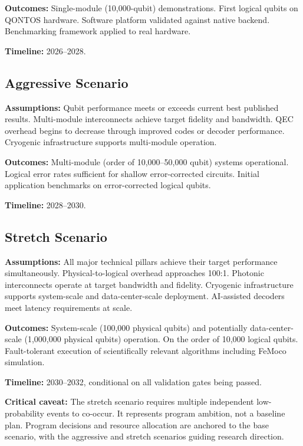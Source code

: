 \documentclass[conference]{IEEEtran}
\begin{document}
\textbf{Outcomes:} Single-module (10,000-qubit) demonstrations. First logical qubits on QONTOS hardware. Software platform validated against native backend. Benchmarking framework applied to real hardware.

\textbf{Timeline:} 2026--2028.

\subsection{Aggressive Scenario}

\textbf{Assumptions:} Qubit performance meets or exceeds current best published results. Multi-module interconnects achieve target fidelity and bandwidth. QEC overhead begins to decrease through improved codes or decoder performance. Cryogenic infrastructure supports multi-module operation.

\textbf{Outcomes:} Multi-module (order of 10,000--50,000 qubit) systems operational. Logical error rates sufficient for shallow error-corrected circuits. Initial application benchmarks on error-corrected logical qubits.

\textbf{Timeline:} 2028--2030.

\subsection{Stretch Scenario}

\textbf{Assumptions:} All major technical pillars achieve their target performance simultaneously. Physical-to-logical overhead approaches 100:1. Photonic interconnects operate at target bandwidth and fidelity. Cryogenic infrastructure supports system-scale and data-center-scale deployment. AI-assisted decoders meet latency requirements at scale.

\textbf{Outcomes:} System-scale (100,000 physical qubits) and potentially data-center-scale (1,000,000 physical qubits) operation. On the order of 10,000 logical qubits. Fault-tolerant execution of scientifically relevant algorithms including FeMoco simulation.

\textbf{Timeline:} 2030--2032, conditional on all validation gates being passed.

\textbf{Critical caveat:} The stretch scenario requires multiple independent low-probability events to co-occur. It represents program ambition, not a baseline plan. Program decisions and resource allocation are anchored to the base scenario, with the aggressive and stretch scenarios guiding research direction.
\end{document}
